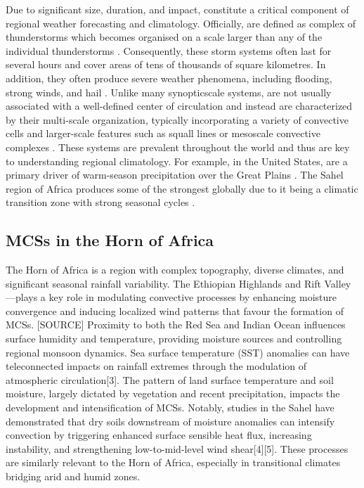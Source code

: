 Due to significant size, duration, and impact,  constitute a critical component of regional weather forecasting and climatology. Officially,  are defined as complex of thunderstorms which becomes organised on a scale larger than any of the individual thunderstorms \citep{NOAANWS2025}. Consequently, these storm systems often last for several hours and cover areas of tens of thousands of square kilometres. In addition, they often produce severe weather phenomena, including flooding, strong winds, and hail \citep{Houze2014}. Unlike many \Gls{synopticscale} systems,  are not usually associated with a well-defined center of circulation and instead are characterized by their multi-scale organization, typically incorporating a variety of convective cells and larger-scale features such as squall lines or mesoscale convective complexes \citep{NOAANWS2025,AMS2024}. These systems are prevalent throughout the world and thus are key to understanding regional climatology. For example, in the United States,  are a primary driver of warm-season precipitation over the Great Plains \citep{Haberlie2019}. The Sahel region of Africa produces some of the strongest  globally due to it being a climatic transition zone with strong seasonal cycles \citep{Zipser2006}.

\subsection{MCSs in the Horn of Africa}

The Horn of Africa is a region with complex topography, diverse climates, and significant seasonal rainfall variability. The Ethiopian Highlands and Rift Valley—plays a key role in modulating convective processes by enhancing moisture convergence and inducing localized wind patterns that favour the formation of MCSs. [SOURCE] Proximity to both the Red Sea and Indian Ocean influences surface humidity and temperature, providing moisture sources and controlling regional monsoon dynamics. Sea surface temperature (SST) anomalies can have teleconnected impacts on rainfall extremes through the modulation of atmospheric circulation[3]. The pattern of land surface temperature and soil moisture, largely dictated by vegetation and recent precipitation, impacts the development and intensification of MCSs. Notably, studies in the Sahel have demonstrated that dry soils downstream of moisture anomalies can intensify convection by triggering enhanced surface sensible heat flux, increasing instability, and strengthening low-to-mid-level wind shear[4][5]. These processes are similarly relevant to the Horn of Africa, especially in transitional climates bridging arid and humid zones.

